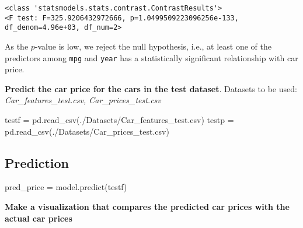 \documentclass[
  letterpaper,
  DIV=11,
  numbers=noendperiod]{scrreprt}
\newenvironment{Shaded}{\begin{snugshade}}{\end{snugshade}}
\newcommand{\NormalTok}[1]{\textcolor[rgb]{0.00,0.23,0.31}{#1}}
\newcommand{\OperatorTok}[1]{\textcolor[rgb]{0.37,0.37,0.37}{#1}}
\newcommand{\StringTok}[1]{\textcolor[rgb]{0.13,0.47,0.30}{#1}}
\begin{document}
\begin{verbatim}
<class 'statsmodels.stats.contrast.ContrastResults'>
<F test: F=325.9206432972666, p=1.0499509223096256e-133, df_denom=4.96e+03, df_num=2>
\end{verbatim}

As the \(p\)-value is low, we reject the null hypothesis, i.e., at least
one of the predictors among \texttt{mpg} and \texttt{year} has a
statistically significant relationship with car price.

\textbf{Predict the car price for the cars in the test dataset}.
Datasets to be used: \emph{Car\_features\_test.csv,
Car\_prices\_test.csv}

\begin{Shaded}
\begin{Highlighting}[]
\NormalTok{testf }\OperatorTok{=}\NormalTok{ pd.read\_csv(}\StringTok{\textquotesingle{}./Datasets/Car\_features\_test.csv\textquotesingle{}}\NormalTok{)}
\NormalTok{testp }\OperatorTok{=}\NormalTok{ pd.read\_csv(}\StringTok{\textquotesingle{}./Datasets/Car\_prices\_test.csv\textquotesingle{}}\NormalTok{)}
\end{Highlighting}
\end{Shaded}

\subsection{Prediction}\label{prediction}

\begin{Shaded}
\begin{Highlighting}[]
\NormalTok{pred\_price }\OperatorTok{=}\NormalTok{ model.predict(testf)}
\end{Highlighting}
\end{Shaded}

\textbf{Make a visualization that compares the predicted car prices with
the actual car prices}
\end{document}
